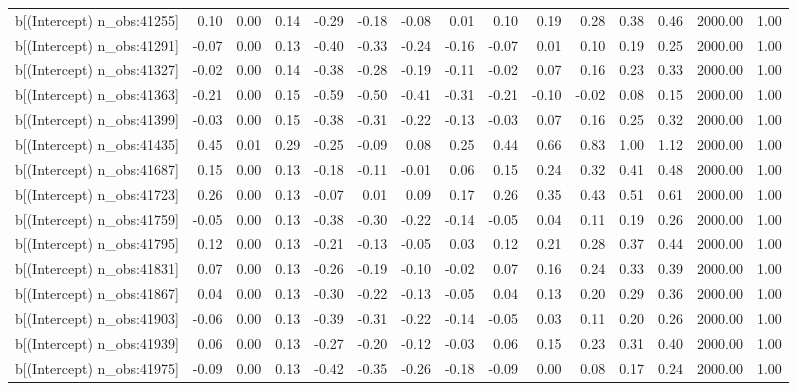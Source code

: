 \begin{table}[ht]
\begin{tabular}{rrrrrrrrrrrrrrr}
  b[(Intercept) n\_obs:41255] & 0.10 & 0.00 & 0.14 & -0.29 & -0.18 & -0.08 & 0.01 & 0.10 & 0.19 & 0.28 & 0.38 & 0.46 & 2000.00 & 1.00 \\ 
  b[(Intercept) n\_obs:41291] & -0.07 & 0.00 & 0.13 & -0.40 & -0.33 & -0.24 & -0.16 & -0.07 & 0.01 & 0.10 & 0.19 & 0.25 & 2000.00 & 1.00 \\ 
  b[(Intercept) n\_obs:41327] & -0.02 & 0.00 & 0.14 & -0.38 & -0.28 & -0.19 & -0.11 & -0.02 & 0.07 & 0.16 & 0.23 & 0.33 & 2000.00 & 1.00 \\ 
  b[(Intercept) n\_obs:41363] & -0.21 & 0.00 & 0.15 & -0.59 & -0.50 & -0.41 & -0.31 & -0.21 & -0.10 & -0.02 & 0.08 & 0.15 & 2000.00 & 1.00 \\ 
  b[(Intercept) n\_obs:41399] & -0.03 & 0.00 & 0.15 & -0.38 & -0.31 & -0.22 & -0.13 & -0.03 & 0.07 & 0.16 & 0.25 & 0.32 & 2000.00 & 1.00 \\ 
  b[(Intercept) n\_obs:41435] & 0.45 & 0.01 & 0.29 & -0.25 & -0.09 & 0.08 & 0.25 & 0.44 & 0.66 & 0.83 & 1.00 & 1.12 & 2000.00 & 1.00 \\ 
  b[(Intercept) n\_obs:41687] & 0.15 & 0.00 & 0.13 & -0.18 & -0.11 & -0.01 & 0.06 & 0.15 & 0.24 & 0.32 & 0.41 & 0.48 & 2000.00 & 1.00 \\ 
  b[(Intercept) n\_obs:41723] & 0.26 & 0.00 & 0.13 & -0.07 & 0.01 & 0.09 & 0.17 & 0.26 & 0.35 & 0.43 & 0.51 & 0.61 & 2000.00 & 1.00 \\ 
  b[(Intercept) n\_obs:41759] & -0.05 & 0.00 & 0.13 & -0.38 & -0.30 & -0.22 & -0.14 & -0.05 & 0.04 & 0.11 & 0.19 & 0.26 & 2000.00 & 1.00 \\ 
  b[(Intercept) n\_obs:41795] & 0.12 & 0.00 & 0.13 & -0.21 & -0.13 & -0.05 & 0.03 & 0.12 & 0.21 & 0.28 & 0.37 & 0.44 & 2000.00 & 1.00 \\ 
  b[(Intercept) n\_obs:41831] & 0.07 & 0.00 & 0.13 & -0.26 & -0.19 & -0.10 & -0.02 & 0.07 & 0.16 & 0.24 & 0.33 & 0.39 & 2000.00 & 1.00 \\ 
  b[(Intercept) n\_obs:41867] & 0.04 & 0.00 & 0.13 & -0.30 & -0.22 & -0.13 & -0.05 & 0.04 & 0.13 & 0.20 & 0.29 & 0.36 & 2000.00 & 1.00 \\ 
  b[(Intercept) n\_obs:41903] & -0.06 & 0.00 & 0.13 & -0.39 & -0.31 & -0.22 & -0.14 & -0.05 & 0.03 & 0.11 & 0.20 & 0.26 & 2000.00 & 1.00 \\ 
  b[(Intercept) n\_obs:41939] & 0.06 & 0.00 & 0.13 & -0.27 & -0.20 & -0.12 & -0.03 & 0.06 & 0.15 & 0.23 & 0.31 & 0.40 & 2000.00 & 1.00 \\ 
  b[(Intercept) n\_obs:41975] & -0.09 & 0.00 & 0.13 & -0.42 & -0.35 & -0.26 & -0.18 & -0.09 & 0.00 & 0.08 & 0.17 & 0.24 & 2000.00 & 1.00 \\ 

\end{tabular}
\end{table}
